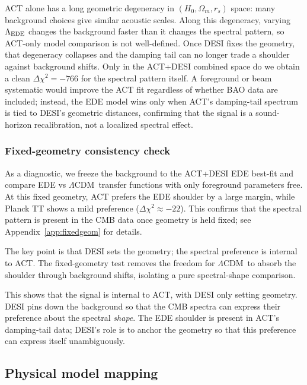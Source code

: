 \documentclass[onecolumn,showpacs,preprintnumbers,amsmath,amssymb,prd]{revtex4-2}
\newcommand{\lcdm}{$\Lambda$CDM}
\begin{document}
ACT alone has a long geometric degeneracy in $(H_0, \Omega_m, r_s)$ space: 
many background choices give similar acoustic scales. Along this degeneracy, 
varying $\Lambda_{\rm EDE}$ changes the background faster than it changes the 
spectral pattern, so ACT-only model comparison is not well-defined. Once DESI 
fixes the geometry, that degeneracy collapses and the damping tail can no longer 
trade a shoulder against background shifts. Only in the ACT+DESI combined space 
do we obtain a clean $\Delta\chi^2 = -766$ for the spectral pattern itself. 
A foreground or beam systematic would improve the ACT fit regardless of whether 
BAO data are included; instead, the EDE model wins only when ACT's damping-tail 
spectrum is tied to DESI's geometric distances, confirming that the signal is a 
sound-horizon recalibration, not a localized spectral effect.

\subsubsection{Fixed-geometry consistency check}
\label{sec:fixed_geometry}

As a diagnostic, we freeze the background to the ACT+DESI EDE best-fit and 
compare EDE vs \lcdm\ transfer functions with only foreground parameters free. 
At this fixed geometry, ACT prefers the EDE shoulder by a large margin, while 
Planck TT shows a mild preference ($\Delta\chi^2 \approx -22$). This confirms 
that the spectral pattern is present in the CMB data once geometry is held 
fixed; see Appendix~\ref{app:fixedgeom} for details.

The key point is that DESI sets the geometry; the spectral preference is 
internal to ACT. The fixed-geometry test removes the freedom for \lcdm\ to 
absorb the shoulder through background shifts, isolating a pure spectral-shape 
comparison.

This shows that the signal is internal to ACT, with DESI only setting 
geometry. DESI pins down the background so that the CMB spectra can express 
their preference about the spectral \emph{shape}. The EDE shoulder is present 
in ACT's damping-tail data; DESI's role is to anchor the geometry so that 
this preference can express itself unambiguously.

\subsection{Physical model mapping}
\label{sec:free_lambda}
\end{document}
